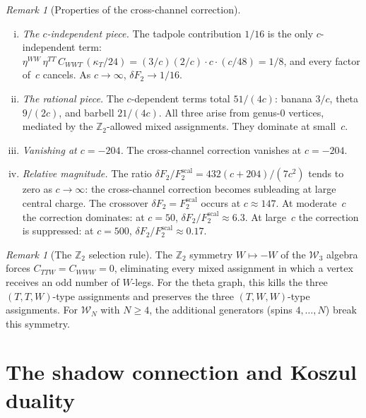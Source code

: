 \documentclass[11pt]{article}
\theoremstyle{plain}
\theoremstyle{definition}
\theoremstyle{remark}
\newtheorem{remark}[theorem]{Remark}
\newcommand{\cW}{\mathcal{W}}
\begin{document}
\begin{remark}[Properties of the cross-channel correction]
\label{rem:cross-channel-properties}
\leavevmode
\begin{enumerate}[(i)]
\item \emph{The $c$-independent piece.}\enspace
 The tadpole contribution $1/16$ is the only
 $c$-independent term:
 $\eta^{WW}\,\eta^{TT}\,C_{WWT}\,({\kappa_T}/{24})
 = (3/c)(2/c) \cdot c \cdot (c/48) = 1/8$,
 and every factor of~$c$ cancels. As $c \to \infty$,
 $\delta F_2 \to 1/16$.

\item \emph{The rational piece.}\enspace
 The $c$-dependent terms total $51/(4c)$: banana $3/c$,
 theta $9/(2c)$, and barbell $21/(4c)$. All three arise
 from genus-$0$ vertices, mediated by the $\mathbb{Z}_2$-allowed
 mixed assignments. They dominate at small~$c$.

\item \emph{Vanishing at $c = -204$.}\enspace
 The cross-channel correction vanishes at $c = -204$.

\item \emph{Relative magnitude.}\enspace
 The ratio
 $\delta F_2 / F_2^{\mathrm{scal}}
 = 432(c+204)/(7c^2)$
 tends to zero as $c \to \infty$: the cross-channel
 correction becomes subleading at large central charge.
 The crossover $\delta F_2 = F_2^{\mathrm{scal}}$
 occurs at $c \approx 147$.
 At moderate~$c$ the correction dominates:
 at $c = 50$, $\delta F_2/F_2^{\mathrm{scal}} \approx 6.3$.
 At large~$c$ the correction is suppressed:
 at $c = 500$, $\delta F_2/F_2^{\mathrm{scal}} \approx 0.17$.
\end{enumerate}
\end{remark}

\begin{remark}[The $\mathbb{Z}_2$ selection rule]
\label{rem:z2-selection}
The $\mathbb{Z}_2$ symmetry $W \mapsto -W$ of the $\cW_3$
algebra forces $C_{TTW} = C_{WWW} = 0$, eliminating every
mixed assignment in which a vertex receives an odd number of
$W$-legs. For the theta graph, this kills the three
$(T,T,W)$-type assignments and preserves the three
$(T,W,W)$-type assignments. For $\cW_N$ with $N \geq 4$,
the additional generators (spins $4, \ldots, N$) break this
symmetry.
\end{remark}

\section{The shadow connection and Koszul duality}
\label{sec:connection}
\end{document}
